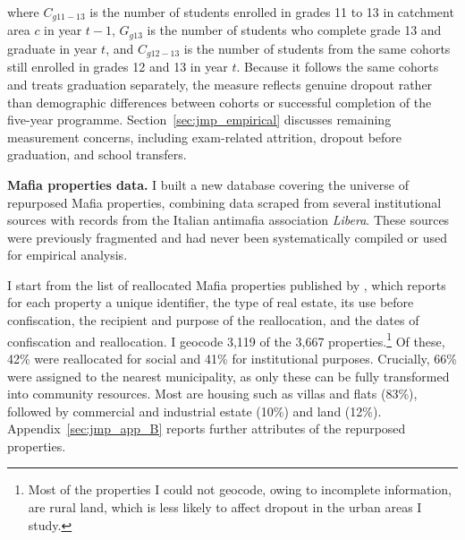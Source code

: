 \documentclass[12pt]{article}
\theoremstyle{plain}
\theoremstyle{plain}
\theoremstyle{plain}
\theoremstyle{definition}
\theoremstyle{plain}
\theoremstyle{definition}
\theoremstyle{plain}
\theoremstyle{remark}
\theoremstyle{definition}
\theoremstyle{definition}
\theoremstyle{plain}
\begin{document}
where $C_{g11-13}$ is the number of students enrolled in grades 11 to 13 in catchment area $c$ in year $t-1$, $G_{g13}$ is the number of students who complete grade 13 and graduate in year $t$, and $C_{g12-13}$ is the number of students from the same cohorts still enrolled in grades 12 and 13 in year $t$. Because it follows the same cohorts and treats graduation separately, the measure reflects genuine dropout rather than demographic differences between cohorts or successful completion of the five-year programme. Section~\ref{sec:jmp_empirical} discusses remaining measurement concerns, including exam-related attrition, dropout before graduation, and school transfers.
\vspace{1cm}

\textbf{Mafia properties data.}
I built a new database covering the universe of repurposed Mafia properties, combining data scraped from several institutional sources with records from the Italian antimafia association \emph{Libera}. These sources were previously fragmented and had never been systematically compiled or used for empirical analysis. \par

I start from the list of reallocated Mafia properties published by \citet{anbsc_beni_2023}, which reports for each property a unique identifier, the type of real estate, its use before confiscation, the recipient and purpose of the reallocation, and the dates of confiscation and reallocation. I geocode 3,119 of the 3,667 properties.\footnote{Most of the properties I could not geocode, owing to incomplete information, are rural land, which is less likely to affect dropout in the urban areas I study.} Of these, 42\% were reallocated for social and 41\% for institutional purposes. Crucially, 66\% were assigned to the nearest municipality, as only these can be fully transformed into community resources. Most are housing such as villas and flats (83\%), followed by commercial and industrial estate (10\%) and land (12\%). Appendix~\ref{sec:jmp_app_B} reports further attributes of the repurposed properties. \par
\end{document}
